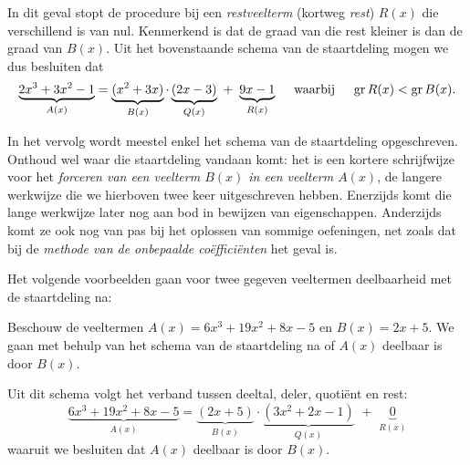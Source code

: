\documentclass{ximera}
\begin{document}
\begin{algorithm}

	In dit geval stopt de procedure bij een \textit{ restveelterm} (kortweg \textit{ rest}) $R(x)$ die verschillend is van nul. Kenmerkend is dat de graad van die rest kleiner is dan de graad van $B(x)$. Uit het bovenstaande schema van de staartdeling mogen we dus besluiten dat
	\[
	\underbrace{2x^3+3x^2-1}_{A(x)} = \underbrace{(x^2+3x)}_{B(x)}\cdot\underbrace{(2x - 3)}_{Q(x)} \,\, + \,\, \underbrace{9x - 1}_{R(x)} \quad \text{ waarbij } \quad \operatorname{gr} R(x) < \operatorname{gr} B(x).
	\]

	\end{algorithm} 
	
	In het vervolg wordt meestel enkel het schema van de staartdeling opgeschreven. Onthoud wel waar die staartdeling vandaan komt: het is een kortere schrijfwijze voor het \textit{ forceren van een veelterm $B(x)$ in een veelterm $A(x)$}, de langere werkwijze die we hierboven twee keer uitgeschreven hebben. Enerzijds komt die lange werkwijze later nog aan bod in bewijzen van eigenschappen. Anderzijds komt ze ook nog van pas bij het oplossen van sommige oefeningen, net zoals dat bij de \textit{methode van de onbepaalde coëfficiënten} het geval is.
	
	


	Het volgende voorbeelden gaan voor twee gegeven veeltermen deelbaarheid met de staartdeling na: 


	\begin{example} 
	Beschouw de veeltermen $A(x) = 6x^3 + 19x^2 + 8x - 5$ en $B(x) = 2x+5$. We gaan met behulp van het schema van de staartdeling na of $A(x)$ deelbaar is door $B(x)$. 
	
	
	Uit dit schema volgt het verband tussen deeltal, deler, quotiënt en rest:
	\[
	\underbrace{6x^3 + 19x^2 + 8x - 5}_{A(x)} = \underbrace{(2x+5)}_{B(x)}\cdot\underbrace{(3x^2+2x-1)}_{Q(x)} \,\, + \,\, \underbrace{0}_{R(x)} 
	\]
	waaruit we besluiten dat $A(x)$ deelbaar is door $B(x)$.
	\end{example} 
\end{document}
